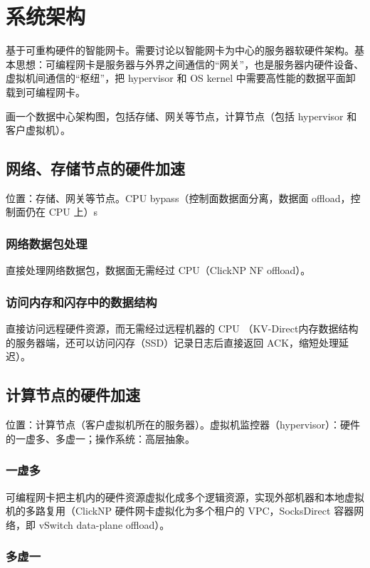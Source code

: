 \chapter{系统架构}

基于可重构硬件的智能网卡。需要讨论以智能网卡为中心的服务器软硬件架构。基本思想：可编程网卡是服务器与外界之间通信的“网关”，也是服务器内硬件设备、虚拟机间通信的“枢纽”，把 hypervisor 和 OS kernel 中需要高性能的数据平面卸载到可编程网卡。

画一个数据中心架构图，包括存储、网关等节点，计算节点（包括 hypervisor 和客户虚拟机）。

\section{网络、存储节点的硬件加速}

位置：存储、网关等节点。CPU bypass（控制面数据面分离，数据面 offload，控制面仍在 CPU 上）s

\subsection{网络数据包处理}

直接处理网络数据包，数据面无需经过 CPU（ClickNP NF offload）。

\subsection{访问内存和闪存中的数据结构}

直接访问远程硬件资源，而无需经过远程机器的 CPU （KV-Direct内存数据结构的服务器端，还可以访问闪存（SSD）记录日志后直接返回 ACK，缩短处理延迟）。

\section{计算节点的硬件加速}

位置：计算节点（客户虚拟机所在的服务器）。虚拟机监控器（hypervisor）：硬件的一虚多、多虚一；操作系统：高层抽象。

\subsection{一虚多}

可编程网卡把主机内的硬件资源虚拟化成多个逻辑资源，实现外部机器和本地虚拟机的多路复用（ClickNP 硬件网卡虚拟化为多个租户的 VPC，SocksDirect 容器网络，即 vSwitch data-plane offload）。

\subsection{多虚一}

